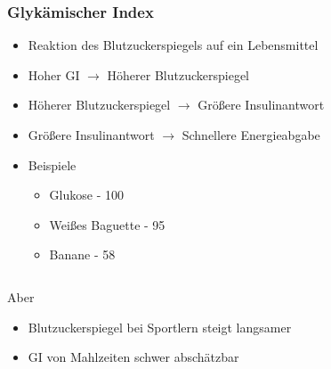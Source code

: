 \documentclass[ngerman, aspectratio=169]{beamer}
\begin{document}
\begin{frame}[allowframebreaks]
  \frametitle{Glykämischer Index}
  \begin{itemize}
  \item Reaktion des Blutzuckerspiegels auf ein Lebensmittel
  \item Hoher GI $→$ Höherer Blutzuckerspiegel
  \item Höherer Blutzuckerspiegel $→$ Größere Insulinantwort
  \item Größere Insulinantwort $→$ Schnellere Energieabgabe
  \item Beispiele
    \begin{itemize}
    \item Glukose - 100
    \item Weißes Baguette - 95
    \item Banane - 58
    \end{itemize}

  \end{itemize}
\framebreak
  \begin{columns}
    \begin{column}{0.7\textwidth}
      Aber

      \begin{itemize}
      \item Blutzuckerspiegel bei Sportlern steigt langsamer
      \item GI von Mahlzeiten schwer abschätzbar
      \end{itemize}
      
    \end{column}
    

\end{columns}
\end{frame}
\end{document}
